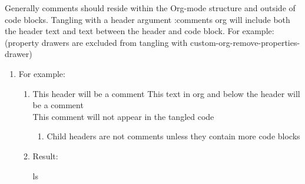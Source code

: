 \documentclass{article}
\begin{document}
Generally comments should reside within the Org-mode structure and outside of code blocks. Tangling with a header argument :comments org will include both the header text and text between the header and code block. For example:\\[0pt]

(property drawers are excluded from tangling with custom-org-remove-properties-drawer)\\[0pt]
\begin{enumerate}
\item For example:
\label{sec:org00ea609}
\begin{enumerate}
\item This header will be a comment
\label{sec:org157ac43}
This text in org and below the header will be a comment\\[0pt]

This comment will not appear in the tangled code\\[0pt]

\begin{enumerate}
\item Child headers are not comments unless they contain more code blocks
\label{sec:org751ac9b}
\end{enumerate}
\item Result:
\label{sec:orga467bad}

ls\\[0pt]
\end{enumerate}
\end{enumerate}
\end{document}
